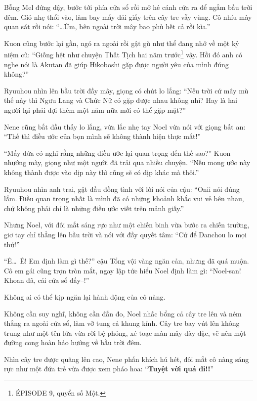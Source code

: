 \documentclass[../main.tex]{subfiles}
\begin{document}
Bỗng Mel đứng dậy, bước tới phía cửa sổ rồi mở hé cánh cửa ra để ngắm bầu trời đêm. Gió nhẹ thổi vào, làm bay mấy dải giấy trên cây tre vẫy vùng. Cô nhíu mày quan sát rồi nói: ``\dots Ừm, bên ngoài trời mây bao phủ hết cả rồi kìa.''

Kuon cũng bước lại gần, ngó ra ngoài rồi gật gù như thể đang nhớ về một kỷ niệm cũ: ``Giống hệt như chuyện Thất Tịch hai năm trước\footnote{{\flaregothic ÉPISODE 9}, quyển số Một.} vậy. Hồi đó anh có nghe nói là Akutan đã giúp Hikoboshi gặp được người yêu của mình đúng không?''

Ryuuhou nhìn lên bầu trời đầy mây, giọng có chút lo lắng: ``Nếu trời cứ mây mù thế này thì Ngưu Lang và Chức Nữ có gặp được nhau không nhỉ? Hay là hai người lại phải đợi thêm một năm nữa mới có thể gặp mặt?''

Nene cũng bắt đầu thấy lo lắng, vừa lắc nhẹ tay Noel vừa nói với giọng bất an: ``Thế thì điều ước của bọn mình sẽ không thành hiện thực mất!''

``Mấy đứa có nghĩ rằng những điều ước lại quan trọng đến thế sao?'' Kuon nhướng mày, giọng như một người đã trải qua nhiều chuyện. ``Nếu mong ước này không thành được vào dịp này thì cũng sẽ có dịp khác mà thôi.''

Ryuuhou nhìn anh trai, gật đầu đồng tình với lời nói của cậu: ``Onii nói đúng lắm. Điều quan trọng nhất là mình đã có những khoảnh khắc vui vẻ bên nhau, chứ không phải chỉ là những điều ước viết trên mảnh giấy.''

Nhưng Noel, với đôi mắt sáng rực như một chiến binh vừa bước ra chiến trường, giơ tay chỉ thẳng lên bầu trời và nói với đầy quyết tâm: ``Cứ để Danchou lo mọi thứ!''

``Ê\dots\ Ê! Em định làm gì thế?'' cậu Tổng vội vàng ngăn cản, nhưng đã quá muộn. Cô em gái cũng trợn tròn mắt, ngay lập tức hiểu Noel định làm gì: ``Noel-san! Khoan đã, cái cửa sổ đấy--!''

Không ai có thể kịp ngăn lại hành động của cô nàng.

Không cần suy nghĩ, không cần đắn đo, Noel nhấc bổng cả cây tre lên và ném thẳng ra ngoài cửa sổ, làm vỡ tung cả khung kính. Cây tre bay vút lên không trung như một tên lửa vừa rời bệ phóng, xé toạc màn mây dày đặc, vẽ nên một đường cong hoàn hảo hướng về bầu trời đêm.


Nhìn cây tre được quăng lên cao, Nene phấn khích hú hét, đôi mắt cô nàng sáng rực như một đứa trẻ vừa được xem pháo hoa: ``\textbf{Tuyệt vời quá đi!!}''
\end{document}
